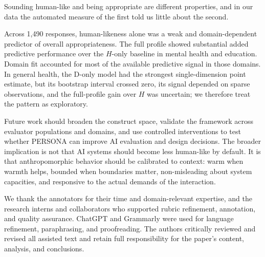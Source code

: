 \documentclass[manuscript,review,anonymous]{acmart}
\begin{document}
Sounding human-like and being appropriate are different properties, and in our data the automated measure of the first told us little about the second.

Across 1,490 responses, human-likeness alone was a weak and domain-dependent predictor of overall appropriateness. The full profile showed substantial added predictive performance over the $H$-only baseline in mental health and education. Domain fit accounted for most of the available predictive signal in those domains. In general health, the D-only model had the strongest single-dimension point estimate, but its bootstrap interval crossed zero, its signal depended on sparse observations, and the full-profile gain over $H$ was uncertain; we therefore treat the pattern as exploratory.

Future work should broaden the construct space, validate the framework across evaluator populations and domains, and use controlled interventions to test whether PERSONA can improve AI evaluation and design decisions. The broader implication is not that AI systems should become less human-like by default. It is that anthropomorphic behavior should be calibrated to context: warm when warmth helps, bounded when boundaries matter, non-misleading about system capacities, and responsive to the actual demands of the interaction.


\begin{acks}
We thank the annotators for their time and domain-relevant expertise, and the research interns and collaborators who supported rubric refinement, annotation, and quality assurance. ChatGPT and Grammarly were used for language refinement, paraphrasing, and proofreading. The authors critically reviewed and revised all assisted text and retain full responsibility for the paper's content, analysis, and conclusions.
\end{acks}



\end{document}

